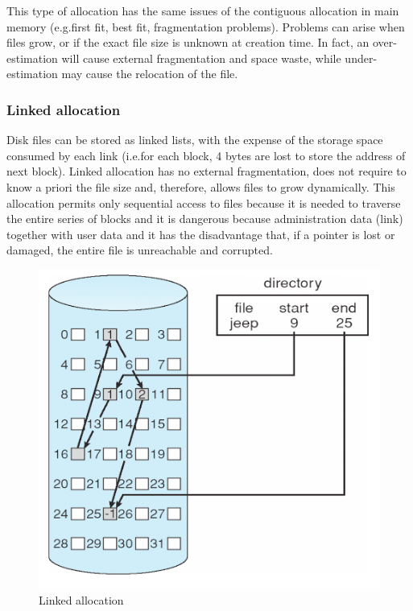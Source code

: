 This type of allocation has the same issues of the contiguous allocation in main memory (e.g.\@ first fit, best fit, fragmentation problems). Problems can arise when files grow, or if the exact file size is unknown at creation time. In fact, an over-estimation will cause external fragmentation and space waste, while under-estimation may cause the relocation of the file.

\subsubsection{Linked allocation}
Disk files can be stored as linked lists, with the expense of the storage space consumed by each link (i.e.\@ for each block, 4 bytes are lost to store the address of next block). Linked allocation has no external fragmentation, does not require to know a priori the file size and, therefore, allows files to grow dynamically. This allocation permits only sequential access to files because it is needed to traverse the entire series of blocks and it is dangerous because administration data (link) together with user data and it has the disadvantage that, if a pointer is lost or damaged, the entire file is unreachable and corrupted.

\begin{figure}[hbtp]
\centering
\includegraphics[scale=0.35]{images/file_system/linked_allocation.png}
\caption{Linked allocation}
\end{figure}

